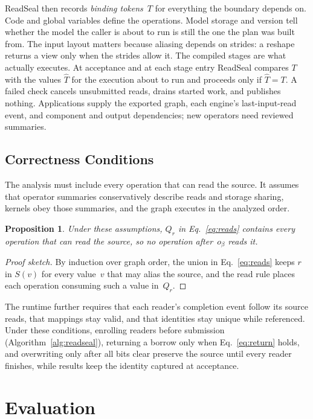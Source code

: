 \documentclass[conference]{IEEEtran}
\newtheorem{proposition}{Proposition}
\begin{document}
ReadSeal then records \emph{binding tokens}~$T$ for everything the boundary depends on. Code and global variables define the operations. Model storage and version tell whether the model the caller is about to run is still the one the plan was built from. The input layout matters because aliasing depends on strides: a reshape returns a view only when the strides allow it. The compiled stages are what actually executes. At acceptance and at each stage entry ReadSeal compares $T$ with the values $\hat T$ for the execution about to run and proceeds only if $\hat T=T$. A failed check cancels unsubmitted reads, drains started work, and publishes nothing. Applications supply the exported graph, each engine's last-input-read event, and component and output dependencies; new operators need reviewed summaries.

\subsection{Correctness Conditions}
\label{sec:correctness}

The analysis must include every operation that can read the source. It assumes that operator summaries conservatively describe reads and storage sharing, kernels obey those summaries, and the graph executes in the analyzed order.

\begin{proposition}
Under these assumptions, $Q_r$ in Eq.~\eqref{eq:reads} contains every operation that can read the source, so no operation after~$o_\beta$ reads it.
\end{proposition}
\begin{proof}[Proof sketch]
By induction over graph order, the union in Eq.~\eqref{eq:reads} keeps $r$ in $S(v)$ for every value~$v$ that may alias the source, and the read rule places each operation consuming such a value in~$Q_r$.
\end{proof}

The runtime further requires that each reader's completion event follow its source reads, that mappings stay valid, and that identities stay unique while referenced. Under these conditions, enrolling readers before submission (Algorithm~\ref{alg:readseal}), returning a borrow only when Eq.~\eqref{eq:return} holds, and overwriting only after all bits clear preserve the source until every reader finishes, while results keep the identity captured at acceptance.

\section{Evaluation}
\label{sec:eval}
\end{document}
